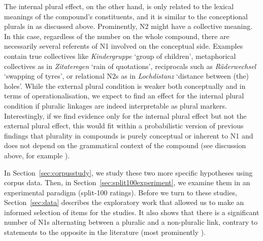 The internal plural effect, on the other hand, is only related to the lexical meanings of the compound's constituents, and it is similar to the conceptional plurals in \textcite{BangaEa2013b} as discussed above.
Prominently, N2 might have a collective meaning.
In this case, regardless of the number on the whole compound, there are necessarily several referents of N1 involved on the conceptual side.
Examples contain true collectives like \textit{Kindergruppe} `group of children', metaphorical collectives as in \textit{Zitateregen} `rain of quotations', reciprocals such as \textit{Räderwechsel} `swapping of tyres', or relational N2s as in \textit{Lochdistanz} `distance between (the) holes'.
While the external plural condition is weaker both conceptually and in terms of operationalisation, we expect to find an effect for the internal plural condition if pluralic linkages are indeed interpretable as plural markers.
Interestingly, if we find evidence only for the internal plural effect but not the external plural effect, this would fit within a probabilistic version of previous findings that plurality in compounds is purely conceptual or inherent to N1 and does not depend on the grammatical context of the compound (see discussion above, for example \citealt{Gallmann1998}).

In Section~\ref{sec:corpusstudy}, we study these two more specific hypotheses using corpus data.
Then, in Section~\ref{sec:split100experiment}, we examine them in an experimental paradigm (split-100 ratings).
Before we turn to these studies, Section~\ref{sec:data} describes the exploratory work that allowed us to make an informed selection of items for the studies.
It also shows that there is a significant number of N1s alternating between a pluralic and a non-pluralic link, contrary to statements to the opposite in the literature (most prominently \citealt{NeefBorgwaldt2012,Neef2015}).
